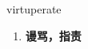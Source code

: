 
\begin{frame}
{\huge virtuperate}
\begin{center}
\begin{enumerate}\Large
  \item \textbf{谩骂，指责}
\end{enumerate}
\end{center}
\end{frame}
